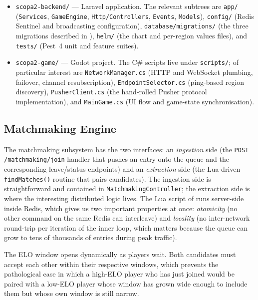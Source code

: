 \documentclass{scrartcl}
\begin{document}
\begin{itemize}[leftmargin=1.4em]
  \item \texttt{scopa2-backend/} --- Laravel application. The relevant
  subtrees are \texttt{app/} (\texttt{Services}, \texttt{GameEngine},
  \texttt{Http/Controllers}, \texttt{Events}, \texttt{Models}),
  \texttt{config/} (Redis Sentinel and broadcasting configuration),
  \texttt{database/migrations/} (the three migrations described in
  ), \texttt{helm/} (the chart and per-region values
  files), and \texttt{tests/} (Pest~4 unit and feature suites).
  \item \texttt{scopa2-game/} --- Godot project. The C\# scripts live
  under \texttt{scripts/}; of particular interest are
  \texttt{NetworkManager.cs} (HTTP and WebSocket plumbing,
  failover, channel resubscription), \texttt{EndpointSelector.cs}
  (ping-based region discovery), \texttt{PusherClient.cs} (the
  hand-rolled Pusher protocol implementation), and \texttt{MainGame.cs}
  (UI flow and game-state synchronisation).
\end{itemize}

\subsection{Matchmaking Engine}

The matchmaking subsystem has the two interfaces: an \emph{ingestion}
side (the \texttt{POST /matchmaking/join} handler that pushes an entry
onto the queue and the corresponding leave/status endpoints) and an
\emph{extraction} side (the Lua-driven \texttt{findMatches()} routine
that pairs candidates). The ingestion side is straightforward and
contained in \texttt{MatchmakingController}; the extraction side is
where the interesting distributed logic lives. The Lua script of
 runs server-side inside Redis, which gives us
two important properties at once: \emph{atomicity} (no other command on
the same Redis can interleave) and \emph{locality} (no
inter-network round-trip per iteration of the inner loop, which matters
because the queue can grow to tens of thousands of entries during peak
traffic).

The ELO window opens dynamically as players wait. Both candidates must
accept each other within their respective windows, which prevents the
pathological case in which a high-ELO player who has just joined would
be paired with a low-ELO player whose window has grown wide enough to
include them but whose own window is still narrow.
\end{document}
